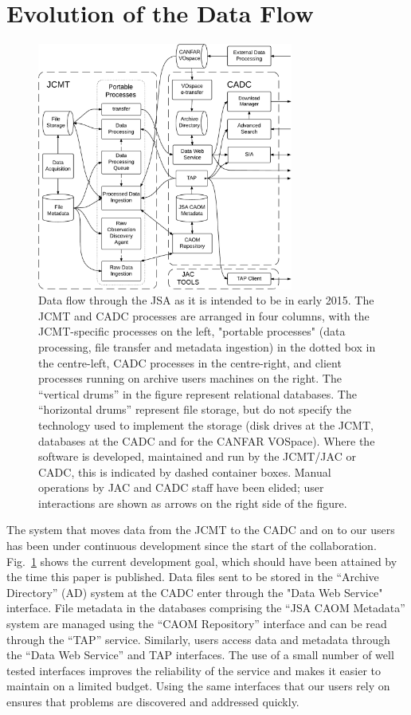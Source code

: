 \documentclass[final,authoryear,5p,times,twocolumn]{elsarticle}
\newcommand*\figref[1]{Fig.~\ref{#1}}
\begin{document}
\section{Evolution of the Data Flow}

\begin{figure}[!ht]
\begin{center}
\includegraphics[width=0.75\textwidth]{jsa_dataflow_2015}
\end{center}
\caption{Data flow through the JSA as it is intended to be in early 2015.  The JCMT and CADC processes are arranged in four columns, with the JCMT-specific processes on the left, "portable processes" (data processing, file transfer and metadata ingestion) in the dotted box in the centre-left, CADC processes in the centre-right, and client processes running on archive users machines on the right.  The ``vertical drums'' in the figure represent relational databases.  The ``horizontal drums'' represent file storage, but do not specify the technology used to implement the storage (disk drives at the JCMT, databases at the CADC and for the CANFAR VOSpace).  Where the software is developed, maintained and run by the JCMT/JAC or CADC, this is indicated by dashed container boxes.     Manual operations by JAC and CADC staff have been elided; user interactions are shown as arrows on the right side of the figure.}
\label{fig:jsadataflow}
\end{figure}

The system that moves data from the JCMT to the CADC and on to our users has been under continuous development since the start of the collaboration.  \figref{fig:jsadataflow} shows the current development goal, which should have been attained by the time this paper is published.  Data files sent to be stored in the ``Archive Directory'' (AD) system at the CADC enter through the "Data Web Service" interface.  File metadata in the databases comprising the ``JSA CAOM Metadata'' system are managed using the ``CAOM Repository'' interface and can be read through the ``TAP'' service.  Similarly, users access data and metadata through the ``Data Web Service'' and TAP interfaces.  The use of a small number of well tested interfaces improves the reliability of the service and makes it easier to maintain on a limited budget.   Using the same interfaces that our users rely on ensures that problems are discovered and addressed quickly.
\end{document}
